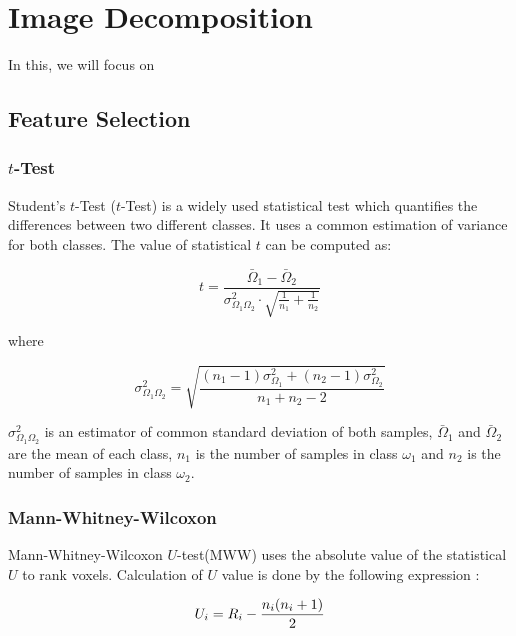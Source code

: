 \chapter{Image Decomposition}\label{ch:decomposition}
In this, we will focus on \cite{Martinez201141,Martinez-Murcia20129676,Martinez-Murcia2013255,Martinez-Murcia201458}
\section{Feature Selection}
\cite{Martinez201141,Martinez-Murcia20129676}
\subsection{$t$-Test}
Student's $t$-Test ($t$-Test) is a widely used statistical test which quantifies the differences between two different classes. It uses a common estimation of variance for both classes. The value of statistical $t$ can be computed \cite{Fay10} as: 

\begin{equation}
t = \frac{\bar {\Omega}_1 - \bar{\Omega}_2}{\sigma^2_{\Omega_1\Omega_2} \cdot \sqrt{\frac{1}{n_1}+\frac{1}{n_2}}}
\end{equation}

\noindent where

\begin{equation}
\sigma^2_{\Omega_1\Omega_2} = \sqrt{\frac{(n_1-1)\sigma^2_{\Omega_1}+(n_2-1)\sigma^2_{\Omega_2}}{n_1+n_2-2}}
\end{equation}

$\sigma^2_{\Omega_1 \Omega_2}$ is an estimator of common standard deviation of both samples, $\bar{\Omega}_1$ and $\bar{\Omega}_2$ are the mean of each class, $n_1$ is the number of samples in class $\omega_1$ and $n_2$ is the number of samples in class $\omega_2$. 

\subsection{Mann-Whitney-Wilcoxon} 
Mann-Whitney-Wilcoxon $U$-test(MWW) uses the absolute value of the statistical $U$ to rank voxels. Calculation of $U$ value is done by the following expression \cite{Fay10}:

\begin{equation}
U_i=R_i -  {n_i(n_i+1) \over 2} 
\end{equation}

